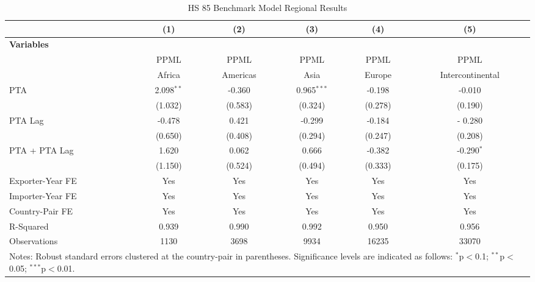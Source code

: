 \begin{table}[htbp]
    \centering
    \caption{HS 85 Benchmark Model Regional Results}
    \label{tab:85_benchmark_region_analysis} %
    \begin{adjustbox}{max width=\textwidth}
    \begin{tabular}{l@{\extracolsep{1pt}}ccccc}
    \hline
    & \multicolumn{1}{c}{(1)} & \multicolumn{1}{c}{(2)} & \multicolumn{1}{c}{(3)} & \multicolumn{1}{c}{(4)} & \multicolumn{1}{c}{(5)} \\
    \hline
    \textbf{Variables} &  &  &  &  &  \\
    \hline
     & PPML & PPML & PPML & PPML & PPML \\
     & Africa & Americas & Asia & Europe & Intercontinental \\
    \hline
    PTA & 2.098$^{\ast\ast}$ & -0.360 & 0.965$^{\ast\ast\ast}$ & -0.198 & -0.010 \\
    & (1.032) & (0.583) & (0.324) & (0.278) & (0.190) \\

    PTA Lag & -0.478 & 0.421 & -0.299 & -0.184 &- 0.280 \\
    & (0.650) & (0.408) & (0.294) & (0.247) & (0.208) \\

    PTA + PTA Lag & 1.620 & 0.062 & 0.666 & -0.382 & -0.290$^{\ast}$ \\
    & (1.150) & (0.524) & (0.494) & (0.333) & (0.175) \\
    \hline
    Exporter-Year FE & Yes & Yes & Yes & Yes & Yes \\
    Importer-Year FE & Yes & Yes & Yes & Yes & Yes \\
    Country-Pair FE & Yes & Yes & Yes & Yes & Yes \\
    R-Squared & 0.939 & 0.990 & 0.992 & 0.950 & 0.956 \\
    Observations & 1130 & 3698 & 9934 & 16235 & 33070 \\
    \hline
    \multicolumn{6}{l}{\footnotesize{Notes: Robust standard errors clustered at the country-pair in parentheses. Significance levels are indicated as follows: $^{\ast}$p$<$0.1; $^{\ast\ast}$p$<$0.05; $^{\ast\ast\ast}$p$<$0.01.}} \\
    \end{tabular}
    \end{adjustbox}
\end{table}
